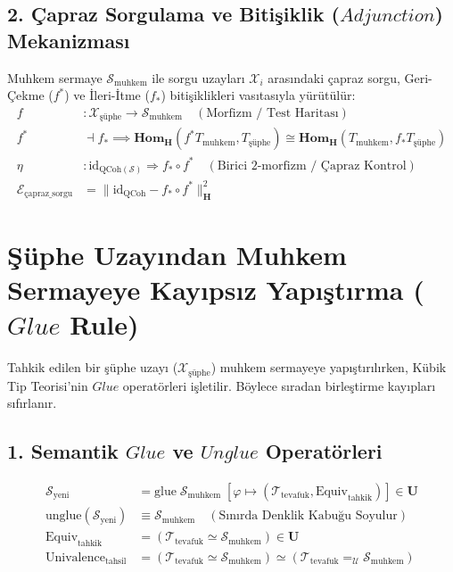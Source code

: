 \documentclass[11pt, a4paper]{article}
\begin{document}
\subsection{2. Çapraz Sorgulama ve Bitişiklik ($Adjunction$) Mekanizması}
Muhkem sermaye $\mathcal{S}_{\text{muhkem}}$ ile sorgu uzayları $\mathcal{X}_i$ arasındaki çapraz sorgu, Geri-Çekme ($f^*$) ve İleri-İtme ($f_*$) bitişiklikleri vasıtasıyla yürütülür:
\begin{align}
f &: \mathcal{X}_{\text{şüphe}} \longrightarrow \mathcal{S}_{\text{muhkem}} \quad (\text{Morfizm / Test Haritası}) \\
f^* &\dashv f_* \implies \mathbf{Hom}_{\mathbf{H}}(f^* T_{\text{muhkem}}, T_{\text{şüphe}}) \cong \mathbf{Hom}_{\mathbf{H}}(T_{\text{muhkem}}, f_* T_{\text{şüphe}}) \\
\eta &: \text{id}_{\text{QCoh}(\mathcal{S})} \Longrightarrow f_* \circ f^* \quad (\text{Birici 2-morfizm / Çapraz Kontrol}) \\
\mathcal{E}_{\text{çapraz\_sorgu}} &= \| \text{id}_{\text{QCoh}} - f_* \circ f^* \|_{\mathbf{H}}^2
\end{align}

\section{Şüphe Uzayından Muhkem Sermayeye Kayıpsız Yapıştırma ($Glue$ Rule)}

Tahkik edilen bir şüphe uzayı ($\mathcal{X}_{\text{şüphe}}$) muhkem sermayeye yapıştırılırken, Kübik Tip Teorisi'nin $Glue$ operatörleri işletilir. Böylece sıradan birleştirme kayıpları sıfırlanır.

\subsection{1. Semantik $Glue$ ve $Unglue$ Operatörleri}
\begin{align}
\mathcal{S}_{\text{yeni}} &= \text{glue} \; \mathcal{S}_{\text{muhkem}} \; \left[ \varphi \mapsto (\mathcal{T}_{\text{tevafuk}}, \text{Equiv}_{\text{tahkik}}) \right] \in \mathbf{U} \\
\text{unglue}(\mathcal{S}_{\text{yeni}}) &\equiv \mathcal{S}_{\text{muhkem}} \quad (\text{Sınırda Denklik Kabuğu Soyulur}) \\
\text{Equiv}_{\text{tahkik}} &= (\mathcal{T}_{\text{tevafuk}} \simeq \mathcal{S}_{\text{muhkem}}) \in \mathbf{U} \\
\text{Univalence}_{\text{tahsil}} &= (\mathcal{T}_{\text{tevafuk}} \simeq \mathcal{S}_{\text{muhkem}}) \simeq (\mathcal{T}_{\text{tevafuk}} =_{\mathcal{U}} \mathcal{S}_{\text{muhkem}})
\end{align}
\end{document}
